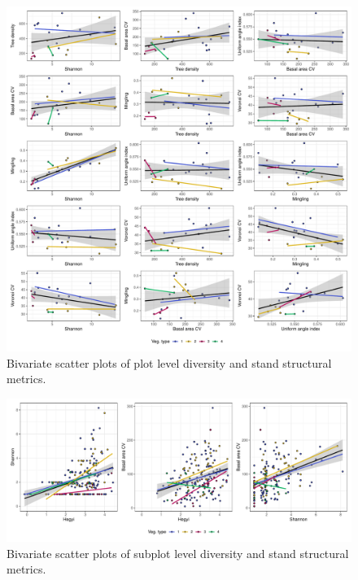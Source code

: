 \documentclass[11pt,a4paper]{article}
\begin{document}
\begin{figure}
	\includegraphics[width=\linewidth]{pred_comp_plot}
	\caption{Bivariate scatter plots of plot level diversity and stand structural metrics.}
	\label{pred_comp_plot}
\end{figure}

\begin{figure}
	\includegraphics[width=\linewidth]{pred_comp_subplot}
	\caption{Bivariate scatter plots of subplot level diversity and stand structural metrics.}
	\label{pred_comp_subplot}
\end{figure}


\end{document}
